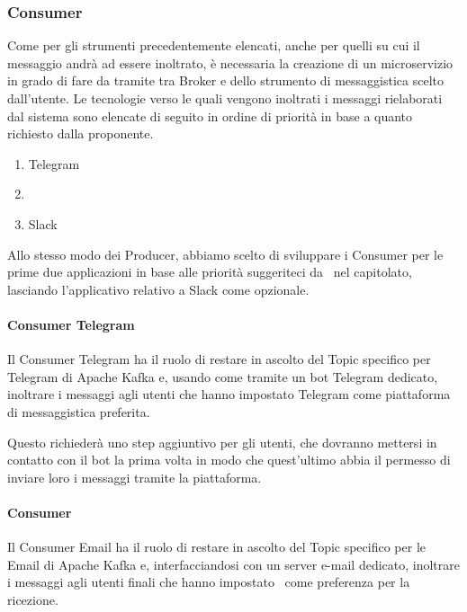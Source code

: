 
	\subsubsection{Consumer}\label{TecnologieConsumer}
		Come per gli strumenti precedentemente elencati, anche per quelli su cui il messaggio andrà ad essere inoltrato, è necessaria la creazione di un microservizio in grado di fare da tramite tra Broker e  dello strumento di messaggistica scelto dall'utente.
		Le tecnologie verso le quali vengono inoltrati i messaggi rielaborati dal sistema sono elencate di seguito in ordine di priorità in base a quanto richiesto dalla proponente.
		\begin{enumerate}
			\item Telegram
			\item \mail
			\item Slack
		\end{enumerate}
		Allo stesso modo dei Producer, abbiamo scelto di sviluppare i Consumer per le prime due applicazioni in base alle priorità suggeriteci da \II\ nel capitolato, lasciando l'applicativo relativo a Slack come opzionale.

		\paragraph{Consumer Telegram}
		Il Consumer Telegram ha il ruolo di restare in ascolto del Topic specifico
		per Telegram di Apache Kafka e, usando come tramite un bot Telegram dedicato, inoltrare i messaggi agli utenti che hanno impostato Telegram come piattaforma di
		messaggistica preferita.

		Questo richiederà uno step aggiuntivo per gli utenti, che dovranno mettersi
		in contatto con il bot la prima volta in modo che quest'ultimo abbia il permesso di inviare
		loro i messaggi tramite la piattaforma.

		\paragraph{Consumer \mail}
		Il Consumer Email ha il ruolo di restare in ascolto del Topic specifico per
		le Email di Apache Kafka e, interfacciandosi con un server e-mail dedicato,
		inoltrare i messaggi agli utenti finali che hanno impostato \mail\ come
		preferenza per la ricezione.

